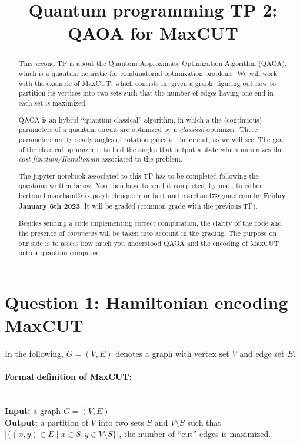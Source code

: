 \documentclass{article}
\title{Quantum programming TP 2: QAOA for {\sc MaxCUT}}
\newcommand{\maxcut}{{\sc MaxCUT}}
\begin{document}
\maketitle
\begin{abstract}
This second TP is about the Quantum Approximate Optimization Algorithm (QAOA), which
is a quantum heuristic for combinatorial optimization problems.
We will work with the example of {\sc MaxCUT}, which consists in,
given a graph, figuring out how to partition its vertices into two
sets such that the number of edges having one end in each set is maximized.

QAOA is an hybrid ``quantum-classical'' algorithm, in which a the (continuous)
parameters of a quantum circuit are optimized by a \emph{classical} optimizer.
These parameters are typically angles of rotation gates in the circuit,
as we will see. The goal of the classical optimizer is to find the angles
that output a state which minimizes the \emph{cost function/Hamiltonian}
associated to the problem.

The jupyter notebook associated to this TP has to be completed
following the questions written below. You then have to send it
completed, by mail, to either bertrand.marchand@lix.polytechnique.fr
or bertrand.marchand7@gmail.com by \textbf{Friday January 6th 2023}.
It will be graded (common grade with the previous TP).

Besides sending a code implementing correct computation,
the clarity of the code and the presence of \emph{comments}
will be taken into account in the grading. The purpose on our side
is to assess how much you understood QAOA and the encoding
of MaxCUT onto a quantum computer.
\end{abstract}


\section{Question 1: Hamiltonian encoding {\sc MaxCUT}}

In the following, $G=(V,E)$ denotes a graph with vertex set $V$ and
edge set $E$.

\paragraph{Formal definition of \maxcut:}~\\
\textbf{Input:} a graph $G=(V,E)$\\
\textbf{Output:} a partition of $V$ into two sets $S$ and $V\setminus S$ such that $|\{(x,y)\in E\mid x\in S, y\in V\setminus S\}|$,
the number of ``cut'' edges is maximized.~\\
\end{document}
